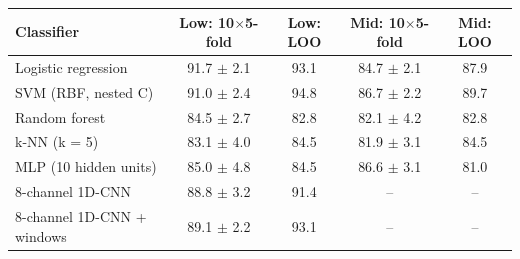 \begin{tabular}{lcccc}
\toprule
\textbf{Classifier} & \textbf{Low: 10$\times$5-fold} & \textbf{Low: LOO} & \textbf{Mid: 10$\times$5-fold} & \textbf{Mid: LOO} \\
\midrule
Logistic regression & 91.7 $\pm$ 2.1 & 93.1 & 84.7 $\pm$ 2.1 & 87.9 \\
SVM (RBF, nested C) & 91.0 $\pm$ 2.4 & 94.8 & 86.7 $\pm$ 2.2 & 89.7 \\
Random forest & 84.5 $\pm$ 2.7 & 82.8 & 82.1 $\pm$ 4.2 & 82.8 \\
k-NN (k = 5) & 83.1 $\pm$ 4.0 & 84.5 & 81.9 $\pm$ 3.1 & 84.5 \\
MLP (10 hidden units) & 85.0 $\pm$ 4.8 & 84.5 & 86.6 $\pm$ 3.1 & 81.0 \\
8-channel 1D-CNN & 88.8 $\pm$ 3.2 & 91.4 & -- & -- \\
8-channel 1D-CNN + windows & 89.1 $\pm$ 2.2 & 93.1 & -- & -- \\
\bottomrule
\end{tabular}
